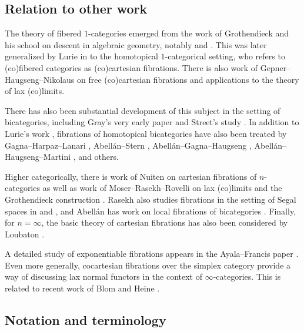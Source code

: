 \documentclass[10pt,oneside]{article}
\numberwithin{equation}{section} %
\numberwithin{figure}{section} %
\theoremstyle{plain}
\theoremstyle{definition}
\begin{document}
\subsection{Relation to other work}
The theory of fibered $1$-categories emerged from the work of Grothendieck and his school on descent in algebraic geometry, notably  \cite{grothendieck1959technique} and \cite{grothendieck2002rev}.
This was later generalized by Lurie in \cite{lurie.HTT} to the homotopical $1$-categorical setting, who refers to (co)fibered categories as (co)cartesian fibrations.
There is also work of Gepner--Haugseng--Nikolaus on free (co)cartesian fibrations \cite{articles} and applications to the theory of lax (co)limits.



There has also been substantial development of this subject in the setting of bicategories, including Gray's very early paper \cite{gray1966fibred} and Street's study \cite{street1980fibrations}.
In addition to Lurie's work \cite{lurie2009infinity}, fibrations of  homotopical bicategories have also been treated by Gagna--Harpaz--Lanari \cite{gagna2020fibrations}, Abell\'an--Stern \cite{abellan20262}, Abell\'an--Gagna--Haugseng \cite{abellán2024straighteninglaxtransformationsadjunctions}, Abell\'an--Haugseng--Martini \cite{abellan2026free}, and others.


Higher categorically, there is work of Nuiten on cartesian fibrations of $n$-categories \cite{nuiten2023straightening} as well as work of Moser--Rasekh--Rovelli on lax (co)limits and the Grothendieck construction \cite{moser2023inftyncategoricalstraighteningunstraighteningconstruction}.
Rasekh also studies fibrations in the setting of Segal spaces in \cite{rasekh2021cartesian} and \cite{rasekh2022cartesian}, and Abell\'an has work on local fibrations of bicategories \cite{abellan2026local}.
Finally, for $n=\infty$, the basic theory of cartesian fibrations has also been considered by Loubaton \cite{loubaton2024categorical}.


A detailed study of exponentiable fibrations appears in the Ayala--Francis paper \cite{MR4074276}.
Even more generally, cocartesian fibrations over the simplex category provide a way of discussing lax normal functors in the context of $\infty$-categories.
This is related to recent work of Blom \cite{blom2024straightening} and Heine \cite{heine2026local}.

\subsection{Notation and terminology}
\end{document}
